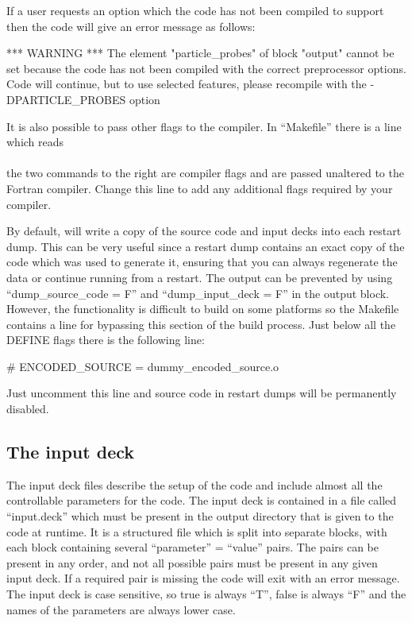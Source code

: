 If a user requests an option which the code has not been compiled to support
then the code will give an error message as follows:
\begin{boxverbatim}
 *** WARNING ***
 The element "particle_probes" of block "output" cannot be set
 because the code has not been compiled with the correct preprocessor options.
 Code will continue, but to use selected features, please recompile with the
 -DPARTICLE_PROBES option
\end{boxverbatim}

It is also possible to pass other flags to the compiler. In ``Makefile'' there
is a line which reads\\
\indent{}\\
the two commands to the right are compiler flags and are passed unaltered to
the Fortran compiler. Change this line to add any additional flags required by
your compiler.

By default, {\EPOCH} will write a copy of the source code and input decks
into each restart dump. This can be very useful since a restart dump contains
an exact copy of the code which was used to generate it, ensuring that you
can always regenerate the data or continue running from a restart.
The output can be prevented by using ``dump\_source\_code = F'' and
``dump\_input\_deck = F'' in the output block.
However, the functionality is difficult to build on some platforms so
the Makefile contains a line for bypassing this section of the build
process. Just below all the DEFINE flags there is the following line:
\begin{boxverbatim}
# ENCODED_SOURCE = dummy_encoded_source.o
\end{boxverbatim}
Just uncomment this line and source code in restart dumps will be permanently
disabled.


\subsection{The {\EPOCH} input deck}
The input deck files describe the setup of the code and
include almost all the controllable parameters for the code. The input deck is
contained in a file called ``input.deck'' which must be present in the output
directory that is given to the code at runtime. It is a structured
file which is split into separate blocks, with each block containing several
``parameter'' = ``value'' pairs. The pairs can be present in any order, and not
all possible pairs must be present in any given input deck. If a required pair
is missing the code will exit with an error message. The input deck is case
sensitive, so true is always ``T'', false is always ``F'' and the names of
the parameters are always lower case.\\

